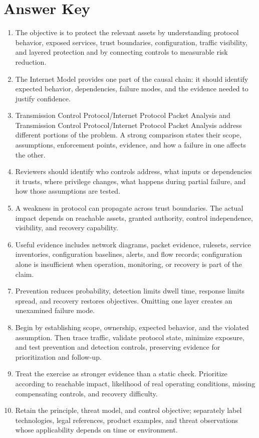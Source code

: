 \documentclass[11pt]{article}
\begin{document}
\section*{Answer Key}
\begin{enumerate}
\item The objective is to protect the relevant assets by understanding protocol behavior, exposed services, trust boundaries, configuration, traffic visibility, and layered protection and by connecting controls to measurable risk reduction.
\item The Internet Model provides one part of the causal chain: it should identify expected behavior, dependencies, failure modes, and the evidence needed to justify confidence.
\item Transmission Control Protocol/Internet Protocol Packet Analysis and Transmission Control Protocol/Internet Protocol Packet Analysis address different portions of the problem. A strong comparison states their scope, assumptions, enforcement points, evidence, and how a failure in one affects the other.
\item Reviewers should identify who controls address, what inputs or dependencies it trusts, where privilege changes, what happens during partial failure, and how those assumptions are tested.
\item A weakness in protocol can propagate across trust boundaries. The actual impact depends on reachable assets, granted authority, control independence, visibility, and recovery capability.
\item Useful evidence includes network diagrams, packet evidence, rulesets, service inventories, configuration baselines, alerts, and flow records; configuration alone is insufficient when operation, monitoring, or recovery is part of the claim.
\item Prevention reduces probability, detection limits dwell time, response limits spread, and recovery restores objectives. Omitting one layer creates an unexamined failure mode.
\item Begin by establishing scope, ownership, expected behavior, and the violated assumption. Then trace traffic, validate protocol state, minimize exposure, and test prevention and detection controls, preserving evidence for prioritization and follow-up.
\item Treat the exercise as stronger evidence than a static check. Prioritize according to reachable impact, likelihood of real operating conditions, missing compensating controls, and recovery difficulty.
\item Retain the principle, threat model, and control objective; separately label technologies, legal references, product examples, and threat observations whose applicability depends on time or environment.
\end{enumerate}
\end{document}
